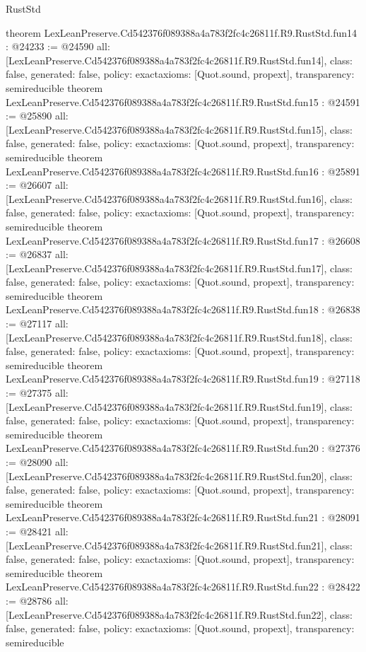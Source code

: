 \begin{lexlean}{RustStd}
\begin{coremodule}
{}
theorem LexLeanPreserve.Cd542376f089388a4a783f2fc4c26811f.R9.RustStd.fun14 : @24233 := @24590 {
  all: [LexLeanPreserve.Cd542376f089388a4a783f2fc4c26811f.R9.RustStd.fun14],
  class: false,
  generated: false,
  policy: exact{axioms: [Quot.sound, propext]},
  transparency: semireducible
}
theorem LexLeanPreserve.Cd542376f089388a4a783f2fc4c26811f.R9.RustStd.fun15 : @24591 := @25890 {
  all: [LexLeanPreserve.Cd542376f089388a4a783f2fc4c26811f.R9.RustStd.fun15],
  class: false,
  generated: false,
  policy: exact{axioms: [Quot.sound, propext]},
  transparency: semireducible
}
theorem LexLeanPreserve.Cd542376f089388a4a783f2fc4c26811f.R9.RustStd.fun16 : @25891 := @26607 {
  all: [LexLeanPreserve.Cd542376f089388a4a783f2fc4c26811f.R9.RustStd.fun16],
  class: false,
  generated: false,
  policy: exact{axioms: [Quot.sound, propext]},
  transparency: semireducible
}
theorem LexLeanPreserve.Cd542376f089388a4a783f2fc4c26811f.R9.RustStd.fun17 : @26608 := @26837 {
  all: [LexLeanPreserve.Cd542376f089388a4a783f2fc4c26811f.R9.RustStd.fun17],
  class: false,
  generated: false,
  policy: exact{axioms: [Quot.sound, propext]},
  transparency: semireducible
}
theorem LexLeanPreserve.Cd542376f089388a4a783f2fc4c26811f.R9.RustStd.fun18 : @26838 := @27117 {
  all: [LexLeanPreserve.Cd542376f089388a4a783f2fc4c26811f.R9.RustStd.fun18],
  class: false,
  generated: false,
  policy: exact{axioms: [Quot.sound, propext]},
  transparency: semireducible
}
theorem LexLeanPreserve.Cd542376f089388a4a783f2fc4c26811f.R9.RustStd.fun19 : @27118 := @27375 {
  all: [LexLeanPreserve.Cd542376f089388a4a783f2fc4c26811f.R9.RustStd.fun19],
  class: false,
  generated: false,
  policy: exact{axioms: [Quot.sound, propext]},
  transparency: semireducible
}
theorem LexLeanPreserve.Cd542376f089388a4a783f2fc4c26811f.R9.RustStd.fun20 : @27376 := @28090 {
  all: [LexLeanPreserve.Cd542376f089388a4a783f2fc4c26811f.R9.RustStd.fun20],
  class: false,
  generated: false,
  policy: exact{axioms: [Quot.sound, propext]},
  transparency: semireducible
}
theorem LexLeanPreserve.Cd542376f089388a4a783f2fc4c26811f.R9.RustStd.fun21 : @28091 := @28421 {
  all: [LexLeanPreserve.Cd542376f089388a4a783f2fc4c26811f.R9.RustStd.fun21],
  class: false,
  generated: false,
  policy: exact{axioms: [Quot.sound, propext]},
  transparency: semireducible
}
theorem LexLeanPreserve.Cd542376f089388a4a783f2fc4c26811f.R9.RustStd.fun22 : @28422 := @28786 {
  all: [LexLeanPreserve.Cd542376f089388a4a783f2fc4c26811f.R9.RustStd.fun22],
  class: false,
  generated: false,
  policy: exact{axioms: [Quot.sound, propext]},
  transparency: semireducible
}
\end{coremodule}
\end{lexlean}

